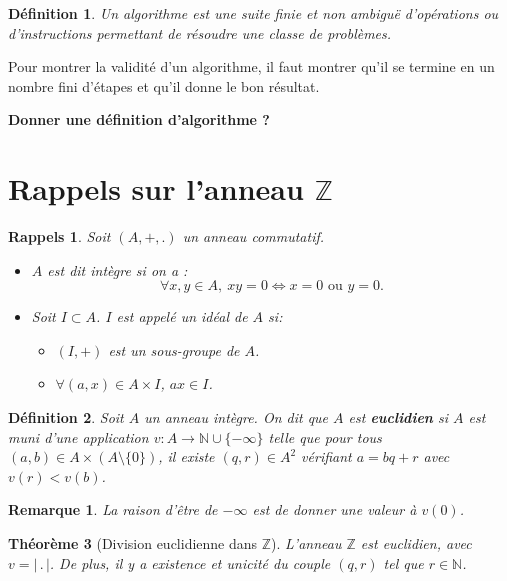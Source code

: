 \documentclass[10pt,a4paper]{report}
\newtheorem{thm}{Théorème}[chapter]
\newtheorem*{rap}{Rappels}
\newtheorem*{rem}{Remarque}
\newtheorem{Def}[thm]{Définition}
\begin{document}
 \begin{Def}
 Un algorithme est une suite finie et non ambiguë d’opérations ou d'instructions permettant de résoudre une classe de problèmes. 
 \end{Def}
 
 Pour montrer la validité d'un algorithme, il faut montrer qu'il se termine en un nombre fini d'étapes et qu'il donne le bon résultat.
 
\textbf{ Donner une définition d'algorithme ?}

\section{Rappels sur l'anneau $\mathbb{Z}$}

\begin{rap}
Soit $(A,+,.)$ un anneau commutatif. 
\begin{itemize}
\item[•] $A$ est dit intègre si on a : \[\forall x,y\in A,\ xy=0 \Leftrightarrow x=0\text{ ou }y=0.\]
\item[•] Soit $I \subset A$. $I$ est appelé un idéal de $A$ si:
\begin{itemize}
\item[$*$]$(I,+)$ est un sous-groupe de $A$.
\item[$*$] $\forall (a,x) \in A \times I$, $ax \in I$.
\end{itemize} 
\end{itemize}
\end{rap}

\begin{Def}
Soit $A$ un anneau intègre. On dit que $A$ est \textbf{euclidien} si $A$ est muni d'une application $v: A \rightarrow \mathbb{N}\cup \{ -\infty \}$ telle que pour tous $(a,b)\in A\times (A\setminus \{ 0 \})$, il existe $(q,r)\in A^2$ vérifiant $a=bq+r$ avec $v(r)<v(b)$.
\end{Def}

\begin{rem}
La raison d'être de $-\infty$ est de donner une valeur à $v(0)$.
\end{rem}

\begin{thm}[Division euclidienne dans $\mathbb{Z}$]
L'anneau $\mathbb{Z}$ est euclidien, avec $v=| \, . \, |$. De plus, il y a existence et unicité du couple $(q,r)$ tel que $r \in \mathbb{N}$.
\end{thm}
\end{document}
